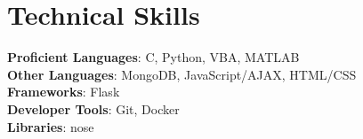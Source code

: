 \documentclass[letterpaper,11pt]{article}
\begin{document}
%
\section{Technical Skills}
 \begin{itemize}[leftmargin=0.15in, label={}]
    \small{\item{
     \textbf{Proficient Languages}{: C, Python, VBA, MATLAB} \\
     \textbf{Other Languages}{: MongoDB, JavaScript/AJAX, HTML/CSS} \\
     \textbf{Frameworks}{: Flask} \\
     \textbf{Developer Tools}{: Git, Docker} \\
     \textbf{Libraries}{: nose}
    }}
 \end{itemize}


\end{document}
